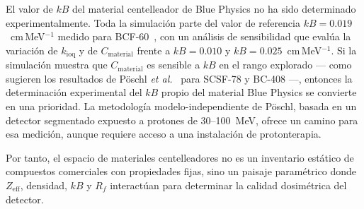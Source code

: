\documentclass[11pt,a4paper]{article}
\begin{document}
El valor de $kB$ del material centelleador de Blue Physics no ha sido determinado experimentalmente. Toda la simulación parte del valor de referencia $kB = 0{.}019$~cm\,MeV$^{-1}$ medido para BCF-60~\cite{santurio2019}, con un análisis de sensibilidad que evalúa la variación de $k_{\mathrm{ioq}}$ y de $C_{\mathrm{material}}$ frente a $kB = 0{.}010$ y $kB = 0{.}025$~cm\,MeV$^{-1}$. Si la simulación muestra que $C_{\mathrm{material}}$ es sensible a $kB$ en el rango explorado --- como sugieren los resultados de Pöschl \textit{et al.}~\cite{poeschl2020} para SCSF-78 y BC-408 ---, entonces la determinación experimental del $kB$ propio del material Blue Physics se convierte en una prioridad. La metodología modelo-independiente de Pöschl, basada en un detector segmentado expuesto a protones de 30--100~MeV, ofrece un camino para esa medición, aunque requiere acceso a una instalación de protonterapia.


Por tanto, el espacio de materiales centelleadores no es un inventario estático de compuestos comerciales con propiedades fijas, sino un paisaje paramétrico donde $Z_{\mathrm{eff}}$, densidad, $kB$ y $R_f$ interactúan para determinar la calidad dosimétrica del detector. %
\end{document}
